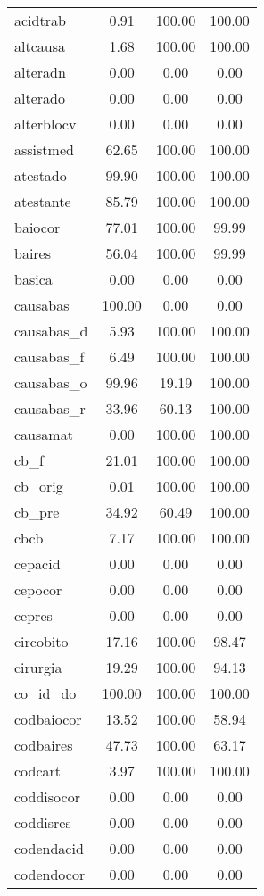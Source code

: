 \documentclass[
  12,
  table]{proadi}
\begin{document}
\begin{longtable}{lccc}
\endfoot
\bottomrule
\endlastfoot
acidtrab & 0.91 & 100.00 & 100.00\\
altcausa & 1.68 & 100.00 & 100.00\\
alteradn & 0.00 & 0.00 & 0.00\\
alterado & 0.00 & 0.00 & 0.00\\
alterblocv & 0.00 & 0.00 & 0.00\\
\addlinespace
assistmed & 62.65 & 100.00 & 100.00\\
atestado & 99.90 & 100.00 & 100.00\\
atestante & 85.79 & 100.00 & 100.00\\
baiocor & 77.01 & 100.00 & 99.99\\
baires & 56.04 & 100.00 & 99.99\\
\addlinespace
basica & 0.00 & 0.00 & 0.00\\
causabas & 100.00 & 0.00 & 0.00\\
causabas\_d & 5.93 & 100.00 & 100.00\\
causabas\_f & 6.49 & 100.00 & 100.00\\
causabas\_o & 99.96 & 19.19 & 100.00\\
\addlinespace
causabas\_r & 33.96 & 60.13 & 100.00\\
causamat & 0.00 & 100.00 & 100.00\\
cb\_f & 21.01 & 100.00 & 100.00\\
cb\_orig & 0.01 & 100.00 & 100.00\\
cb\_pre & 34.92 & 60.49 & 100.00\\
\addlinespace
cbcb & 7.17 & 100.00 & 100.00\\
cepacid & 0.00 & 0.00 & 0.00\\
cepocor & 0.00 & 0.00 & 0.00\\
cepres & 0.00 & 0.00 & 0.00\\
circobito & 17.16 & 100.00 & 98.47\\
\addlinespace
cirurgia & 19.29 & 100.00 & 94.13\\
co\_id\_do & 100.00 & 100.00 & 100.00\\
codbaiocor & 13.52 & 100.00 & 58.94\\
codbaires & 47.73 & 100.00 & 63.17\\
codcart & 3.97 & 100.00 & 100.00\\
\addlinespace
coddisocor & 0.00 & 0.00 & 0.00\\
coddisres & 0.00 & 0.00 & 0.00\\
codendacid & 0.00 & 0.00 & 0.00\\
codendocor & 0.00 & 0.00 & 0.00\\

\end{longtable}
\end{document}
